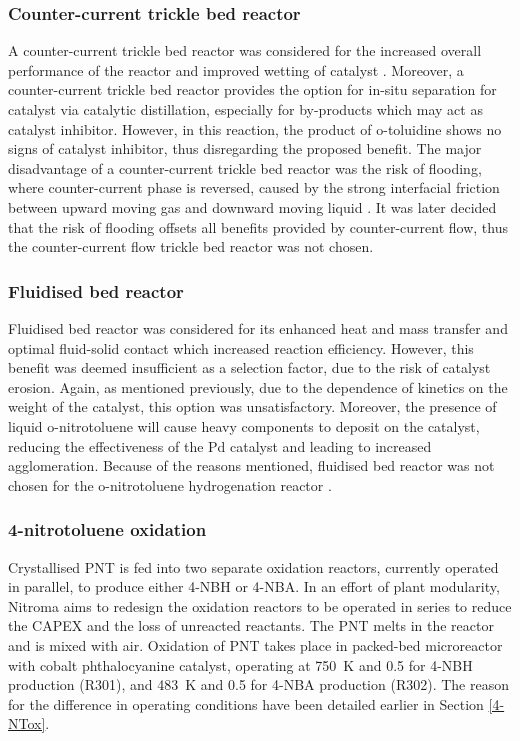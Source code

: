 \subsubsection{Counter-current trickle bed reactor}
A counter-current trickle bed reactor was considered for the increased overall performance of the reactor and improved wetting of catalyst \cite{kundu_novel_2003}. Moreover, a counter-current trickle bed reactor provides the option for in-situ separation for catalyst via catalytic distillation, especially for by-products which may act as catalyst inhibitor. However, in this reaction, the product of o-toluidine shows no signs of catalyst inhibitor, thus disregarding the proposed benefit. The major disadvantage of a counter-current trickle bed reactor was the risk of flooding, where counter-current phase is reversed, caused by the strong interfacial friction between upward moving gas and downward moving liquid \cite{breijer_prevention_2008}. It was later decided that the risk of flooding offsets all benefits provided by counter-current flow, thus the counter-current flow trickle bed reactor was not chosen. 

\subsubsection{Fluidised bed reactor}
\label{fbr}
Fluidised bed reactor was considered for its enhanced heat and mass transfer and optimal fluid-solid contact which increased reaction efficiency. However, this benefit was deemed insufficient as a selection factor, due to the risk of catalyst erosion. Again, as mentioned previously, due to the dependence of kinetics on the weight of the catalyst, this option was unsatisfactory. Moreover, the presence of liquid o-nitrotoluene will cause heavy components to deposit on the catalyst, reducing the effectiveness of the Pd catalyst and leading to increased agglomeration. Because of the reasons mentioned, fluidised bed reactor was not chosen for the o-nitrotoluene hydrogenation reactor \cite{farrell_kinetics_1979}.



\subsubsection{4-nitrotoluene oxidation}

Crystallised PNT is fed into two separate oxidation reactors, currently operated in parallel, to produce either 4-NBH or 4-NBA. In an effort of plant modularity, Nitroma aims to redesign the oxidation reactors to be operated in series to reduce the CAPEX and the loss of unreacted reactants. The PNT melts in the reactor and is mixed with air. Oxidation of PNT takes place in packed-bed microreactor with cobalt phthalocyanine catalyst, operating at \SI{750}{\K} and \SI{0.5}{\atm} for 4-NBH production (R301), and \SI{483}{\K} and \SI{0.5}{\atm} for 4-NBA production (R302). The reason for the difference in operating conditions have been detailed earlier in Section \ref{4-NTox}.

